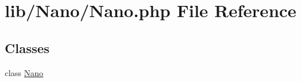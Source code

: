 \hypertarget{Nano_8php}{
\section{lib/Nano/Nano.php File Reference}
\label{Nano_8php}
}
\subsection*{Classes}
\begin{CompactItemize}
\item 
class \hyperlink{classNano}{Nano}
\end{CompactItemize}

